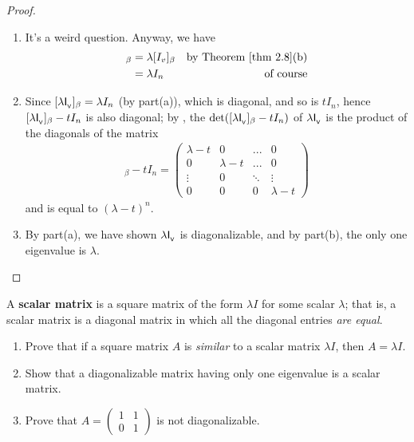 \begin{proof} \ 

\begin{enumerate}
\item It's a weird question.
Anyway, we have
\begin{align*}
    [\lambda I_v]_{\beta} & = \lambda [I_v]_{\beta} & \text{by \THM{2.8}(b)} \\
        & = \lambda I_n & \text{of course}
\end{align*}

\item Since \([\lambda \textsf{I}_{_{\textsf{V}}}]_{\beta} = \lambda I_n\) (by part(a)), which is diagonal, and so is \(tI_n\), hence \([\lambda \textsf{I}_{_{\textsf{V}}}]_{\beta} - tI_n\) is also diagonal;
by , the \CPOLY{} \(\det([\lambda \textsf{I}_{_{\textsf{V}}}]_{\beta} - tI_n)\) of \(\lambda \textsf{I}_{_{\textsf{V}}}\) is the product of the diagonals of the matrix
\begin{align*}
    [\lambda \ITRANV]_{\beta} - tI_n = \begin{pmatrix}
        \lambda - t & 0           & ...    & 0 \\
        0           & \lambda - t & ...    & 0 \\
        \vdots      & 0           & \ddots & \vdots \\
        0           & 0           & 0      & \lambda - t
    \end{pmatrix}
\end{align*}
and is equal to \((\lambda - t)^n\).

\item By part(a), we have shown \(\lambda \textsf{I}_{_{\textsf{V}}}\) is diagonalizable, and by part(b), the only one eigenvalue is \(\lambda\).
\end{enumerate}
\end{proof}

\begin{exercise} \label{exercise 5.1.12}
A \textbf{scalar matrix} is a square matrix of the form \(\lambda I\) for some scalar \(\lambda\);
that is, a scalar matrix is a diagonal matrix in which all the diagonal entries \emph{are equal}.
\begin{enumerate}
\item Prove that if a square matrix \(A\) is \emph{similar} to a scalar matrix \(\lambda I\), then \(A = \lambda I\).
\item Show that a diagonalizable matrix having only one eigenvalue is a scalar matrix.
\item Prove that \(A = \begin{pmatrix} 1 & 1 \\ 0 & 1 \end{pmatrix}\) is not diagonalizable.
\end{enumerate}
\end{exercise}

